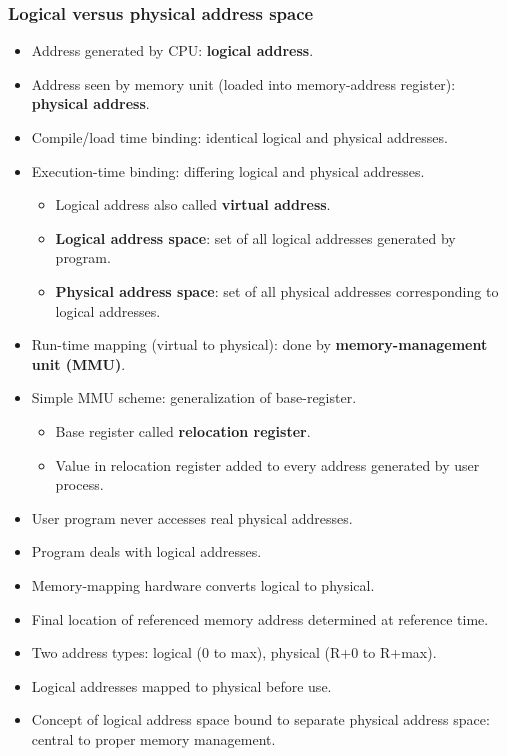 \subsubsection*{Logical versus physical address space}
\begin{itemize}
    \item Address generated by CPU: \textbf{logical address}.
    \item Address seen by memory unit (loaded into memory-address register): \textbf{physical address}.
    \item Compile/load time binding: identical logical and physical addresses.
    \item Execution-time binding: differing logical and physical addresses.
    \begin{itemize}
        \item Logical address also called \textbf{virtual address}.
        \item \textbf{Logical address space}: set of all logical addresses generated by program.
        \item \textbf{Physical address space}: set of all physical addresses corresponding to logical addresses.
    \end{itemize}
    \item Run-time mapping (virtual to physical): done by \textbf{memory-management unit (MMU)}.
    \item Simple MMU scheme: generalization of base-register.
    \begin{itemize}
        \item Base register called \textbf{relocation register}.
        \item Value in relocation register added to every address generated by user process.
    \end{itemize}
    \item User program never accesses real physical addresses.
    \item Program deals with logical addresses.
    \item Memory-mapping hardware converts logical to physical.
    \item Final location of referenced memory address determined at reference time.
    \item Two address types: logical (0 to max), physical (R+0 to R+max).
    \item Logical addresses mapped to physical before use.
    \item Concept of logical address space bound to separate physical address space: central to proper memory management.
\end{itemize}


